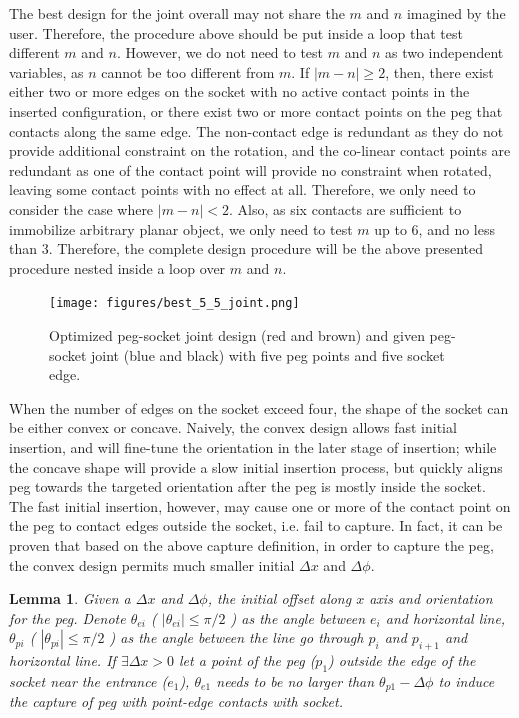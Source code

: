 \documentclass[11pt, twocolumn]{article}
\newtheorem{lemma}[theorem]{Lemma}
\begin{document}
The best design for the joint overall may not share the $m$ and $n$ imagined by the user. Therefore, the procedure above should be put inside a loop that test different $m$ and $n$. However, we do not need to test $m$ and $n$ as two independent variables, as $n$ cannot be too different from $m$. If $|m-n| \geq 2$, then, there exist either two or more edges on the socket with no active contact points in the inserted configuration, or there exist two or more contact points on the peg that contacts along the same edge. The non-contact edge is redundant as they do not provide additional constraint on the rotation, and the co-linear contact points are redundant as one of the contact point will provide no constraint when rotated, leaving some contact points with no effect at all. Therefore, we only need to consider the case where $|m-n| < 2$. Also, as six contacts are sufficient to immobilize arbitrary planar object, we only need to test $m$ up to $6$, and no less than $3$. Therefore, the complete design procedure will be the above presented procedure nested inside a loop over $m$ and $n$. 


\begin{figure}[t]
\begin{center}
\texttt{[image: figures/best\_5\_5\_joint.png]}
\end{center}
\caption{Optimized peg-socket joint design (red and brown) and given peg-socket joint (blue and black) with five peg points and five socket edge. }
\label{fig:best_5_5_joint}
\end{figure}

When the number of edges on the socket exceed four, the shape of the socket can be either convex or concave. Naively, the convex design allows fast initial insertion, and will fine-tune the orientation in the later stage of insertion; while the concave shape will provide a slow initial insertion process, but quickly aligns peg towards the targeted orientation after the peg is mostly inside the socket. The fast initial insertion, however, may cause one or more of the contact point on the peg to contact edges outside the socket, i.e. fail to capture. In fact, it can be proven that based on the above capture definition, in order to capture the peg, the convex design permits much smaller initial $\Delta x$ and $\Delta\phi$. 

\begin{lemma}
Given a $\Delta x$ and $\Delta\phi$, the initial offset along $x$ axis and orientation for the peg. Denote $\theta_{ei}$ ( $| \theta_{ei} | \le\pi/2$ ) as the angle between $e_i$ and horizontal line, $\theta_{pi}$ ( $|\theta_{pi} | \le\pi/2$ ) as the angle between the line go through $p_i$ and $p_{i+1}$ and horizontal line. If $\exists \Delta x > 0$ let a point of the peg ($p_1$) outside the edge of the socket near the entrance ($e_1$), $\theta_{e1}$ needs to be no larger than $\theta_{p1} - \Delta\phi$ to induce the capture of peg with point-edge contacts with socket. 
\end{lemma}
\end{document}
